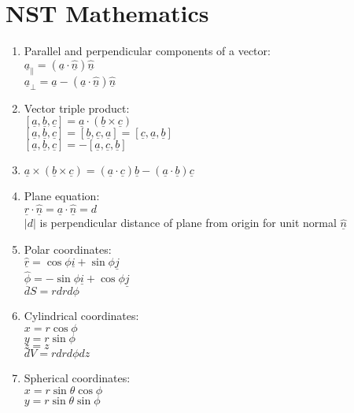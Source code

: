 \documentclass[fleqn]{article}
\author{Victor Zhao\\xz398@cam.ac.uk}
\begin{document}
\centering
\section*{NST Mathematics}
\MyAuthor

\begin{enumerate}
	\item Parallel and perpendicular components of a vector:\\
		$\underline{a}_\parallel=(\underline{a}\cdot\underline{\hat{n}})\underline{\hat{n}}$\\
		$\underline{a}_\perp=\underline{a}-(\underline{a}\cdot\underline{\hat{n}})\underline{\hat{n}}$
	\item Vector triple product:\\
		$[\underline{a},\underline{b},\underline{c}]=\underline{a}\cdot(\underline{b}\times\underline{c})$\\
		$[\underline{a},\underline{b},\underline{c}]=[\underline{b},\underline{c},\underline{a}]=[\underline{c},\underline{a},\underline{b}]$\\
		$[\underline{a},\underline{b},\underline{c}]=-[\underline{a},\underline{c},\underline{b}]$
	\item $\underline{a}\times(\underline{b}\times\underline{c})=(\underline{a}\cdot\underline{c})\underline{b}-(\underline{a}\cdot\underline{b})\underline{c}$
	\item Plane equation:\\
		$\underline{r}\cdot\underline{\hat{n}}=\underline{a}\cdot\underline{\hat{n}}=d$\\
		$|$$d$$|$ is perpendicular distance of plane from origin for unit normal $\underline{\hat{n}}$
	\item Polar coordinates:\\
		$\underline{\hat{r}}=\cos\phi\underline{i}+\sin\phi\underline{j}$\\
		$\underline{\hat{\phi}}=-\sin\phi\underline{i}+\cos\phi\underline{j}$\\
		$dS=rdrd\phi$
	\item Cylindrical coordinates:\\
		$x=r\cos\phi$\\
		$y=r\sin\phi$\\
		$z=z$\\
		$dV=rdrd\phi dz$
	\item Spherical coordinates:\\
		$x=r\sin\theta\cos\phi$\\
		$y=r\sin\theta\sin\phi$\\

\end{enumerate}
\end{document}
